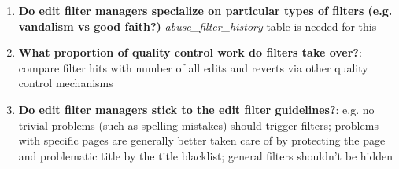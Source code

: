 \begin{enumerate}
    \item \textbf{Do edit filter managers specialize on particular types of filters (e.g. vandalism vs good faith?)} \emph{abuse\_filter\_history } table is needed for this
    \item \textbf{What proportion of quality control work do filters take over?}: compare filter hits with number of all edits and reverts via other quality control mechanisms
    \item \textbf{Do edit filter managers stick to the edit filter guidelines?}: e.g. no trivial problems (such as spelling mistakes) should trigger filters; problems with specific pages are generally better taken care of by protecting the page and problematic title by the title blacklist; general filters shouldn't be hidden
\end{enumerate}
